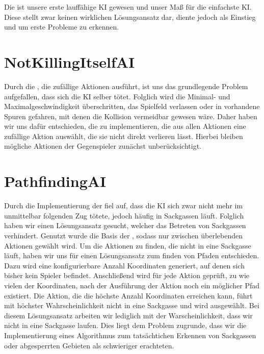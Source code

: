 Die  ist unsere erste lauffähige KI gewesen und unser Maß für die einfachste \acs{KI}.
Diese stellt zwar keinen wirklichen Lösungsansatz dar, diente jedoch als Einstieg und um erste Probleme zu erkennen.


\section{NotKillingItselfAI}
\label{sec:notkillingitself-ai}

Durch die , die zufällige Aktionen ausführt, ist uns das grundlegende Problem aufgefallen, dass sich die
\acs{KI} selber tötet.
Folglich wird die Minimal- und Maximalgeschwindigkeit überschritten, das Spielfeld verlassen oder in vorhandene Spuren
gefahren, mit denen die Kollision vermeidbar gewesen wäre.
Daher haben wir uns dafür entschieden, die  zu implementieren, die aus allen
Aktionen eine zufällige Aktion auswählt, die sie nicht direkt verlieren lässt.
Hierbei bleiben mögliche Aktionen der Gegenspieler zunächst unberücksichtigt.\\


\section{PathfindingAI}
\label{sec:pathfinding-ai}

Durch die Implementierung der  fiel auf, dass die \acs{KI} sich zwar nicht mehr im unmittelbar
folgenden Zug tötete, jedoch häufig in Sackgassen läuft.
Folglich haben wir einen Lösungsansatz gesucht, welcher das Betreten von Sackgassen verhindert.
Genutzt wurde die Basis der , sodass nur zwischen überlebenden Aktionen gewählt wird.
Um die Aktionen zu finden, die nicht in eine Sackgasse läuft, haben wir uns für einen Lösungsansatz zum finden von
Pfaden entschieden.
Dazu wird eine konfigurierbare Anzahl Koordinaten generiert, auf denen sich bisher kein Spieler befindet.
Anschließend wird für jede Aktion geprüft, zu wie vielen der Koordinaten, nach der Ausführung der Aktion noch ein
möglicher Pfad existiert. 
Die Aktion, die die höchste Anzahl Koordinaten erreichen kann, führt mit höchster Wahrscheinlichkeit
nicht in eine Sackgasse und wird ausgewählt.
Bei diesem Lösungsansatz arbeiten wir lediglich mit der Warscheinlichkeit, dass wir nicht in eine Sackgasse laufen.
Dies liegt dem Problem zugrunde, dass wir die Implementierung eines Algorithmus zum tatsächtichen Erkennen von
Sackgassen oder abgesperrten Gebieten als schwieriger erachteten.


